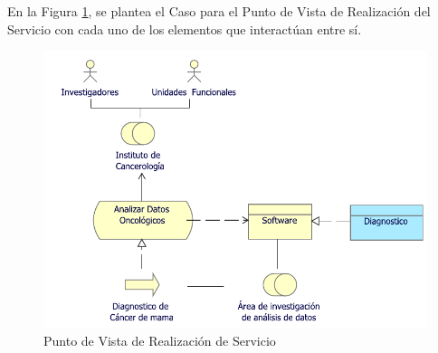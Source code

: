En la Figura \ref{PvRealizaServicio}, se plantea el Caso para el Punto de Vista de Realización del Servicio con cada uno de los elementos que interactúan entre sí. 

\begin{figure}[h!]
	\centering
	\includegraphics[width=1\linewidth]{ARQUITECTURA/imgs/CapaTecnologia/5_PvRealizacionServicioTec}
	\caption{Punto de Vista de Realización de Servicio}
	\label{PvRealizaServicio}
\end{figure}


